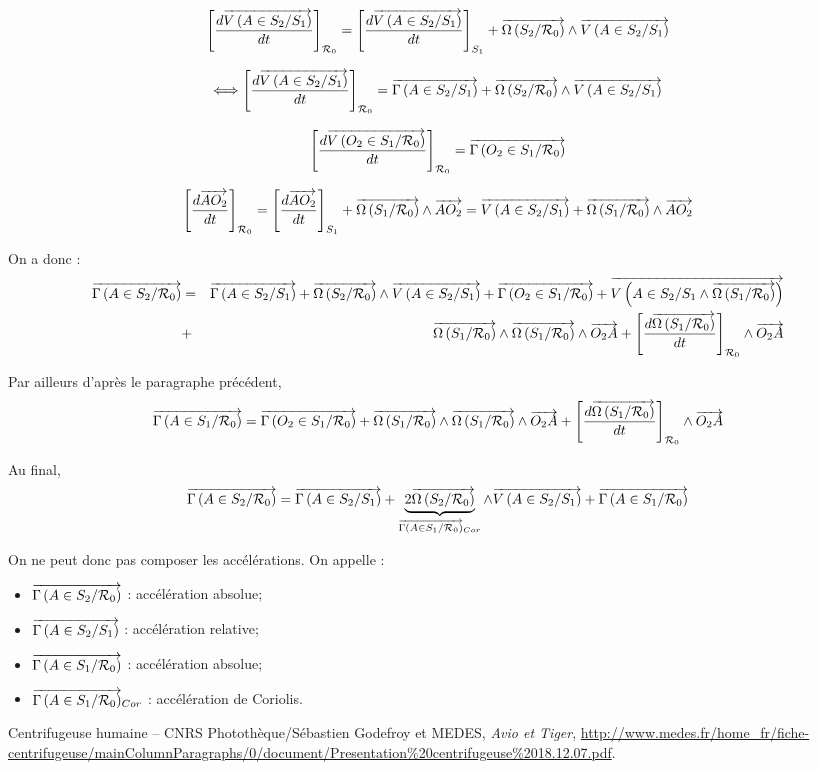 \documentclass[10pt,oneside]{article}
\begin{document}
$$
\left[
\dfrac{d
\vectv{A}{S_2}{S_1} }{dt}
\right]_{\mathcal{R}_0}
=
\left[
\dfrac{d
\vectv{A}{S_2}{S_1} }{dt}
\right]_{S_1}
+
\vecto{S_2}{\mathcal{R}_0}\wedge\vectv{A}{S_2}{S_1}
$$

$$
\Longleftrightarrow
\left[
\dfrac{d
\vectv{A}{S_2}{S_1} }{dt}
\right]_{\mathcal{R}_0}
=
\vectg{A}{S_2}{S_1} 
+
\vecto{S_2}{\mathcal{R}_0}\wedge\vectv{A}{S_2}{S_1}
$$


$$
\left[
\dfrac{d\vectv{O_2}{S_1}{\mathcal{R}_0}}{dt}
\right]_{\mathcal{R}_0} 
= \vectg{O_2}{S_1}{\mathcal{R}_0}
$$

$$
\left[
\dfrac{d\vect{AO_2}}{dt}
\right]_{\mathcal{R}_0}
=
\left[
\dfrac{d\vect{AO_2}}{dt}
\right]_{S_1}
+
\vecto{S_1}{\mathcal{R}_0}
\wedge 
\vect{AO_2}
=
\vectv{A}{S_2}{S_1}+
\vecto{S_1}{\mathcal{R}_0}
\wedge 
\vect{AO_2}
$$


On a donc : 
\begin{eqnarray*}
\vectg{A}{S_2}{\mathcal{R}_0}
&=&
\vectg{A}{S_2}{S_1} + \vecto{S_2}{\mathcal{R}_0}\wedge\vectv{A}{S_2}{S_1}
+\vectg{O_2}{S_1}{\mathcal{R}_0}
+\vectv{A}{S_2}{S_1\wedge \vecto{S_1}{\mathcal{R}_0}}\\
&+&\vecto{S_1}{\mathcal{R}_0} \wedge \vecto{S_1}{\mathcal{R}_0} \wedge \vect{O_2A}
+
\left[
\dfrac{d\vecto{S_1}{\mathcal{R}_0}}{dt}
\right]_{\mathcal{R}_0}
\wedge 
\vect{O_2A}
\end{eqnarray*}

Par ailleurs d'après le paragraphe précédent, 
$$
\vectg{A}{S_1}{\mathcal{R}_0} 
= \vectg{O_2}{S_1}{\mathcal{R}_0} 
+\vecto{S_1}{\mathcal{R}_0} \wedge \vecto{S_1}{\mathcal{R}_0}
\wedge \vect{O_2A}
+\left[\dfrac{d\vecto{S_1}{\mathcal{R}_0}}{dt}\right]_{\mathcal{R}_0} \wedge \vect{O_2A} 
$$

Au final, 
$$
\vectg{A}{S_2}{\mathcal{R}_0}
=
\vectg{A}{S_2}{S_1} + \underbrace{2\vecto{S_2}{\mathcal{R}_0}}_{\vectg{A}{S_1}{\mathcal{R}_0}_{Cor}}\wedge\vectv{A}{S_2}{S_1}
+\vectg{A}{S_1}{\mathcal{R}_0} 
$$


\begin{resultat}
On ne peut donc pas composer les accélérations.
On appelle : 
\begin{itemize}
\item $\vectg{A}{S_2}{\mathcal{R}_0}$ : accélération absolue;
\item $\vectg{A}{S_2}{S_1}$ : accélération relative;
\item $\vectg{A}{S_1}{\mathcal{R}_0}$ : accélération absolue;
\item $\vectg{A}{S_1}{\mathcal{R}_0}_{Cor}$ : accélération de Coriolis.
\end{itemize}
\end{resultat}


\begin{thebibliography}{2}
 Centrifugeuse humaine -- CNRS Photothèque/Sébastien Godefroy et MEDES, \textit{Avio et Tiger}, \url{http://www.medes.fr/home_fr/fiche-centrifugeuse/mainColumnParagraphs/0/document/Presentation%20centrifugeuse%2018.12.07.pdf}.
\end{thebibliography}
\end{document}
